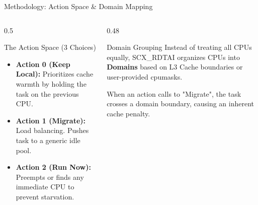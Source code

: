 \documentclass[aspectratio=169]{beamer}
\begin{document}
\begin{frame}{Methodology: Action Space \& Domain Mapping}
    \begin{columns}[T]
        \begin{column}{0.5\textwidth}
            \begin{exampleblock}{The Action Space (3 Choices)}
                \small
                \begin{itemize}
                    \item \textbf{Action 0 (Keep Local):} Prioritizes cache warmth by holding the task on the previous CPU.
                    \item \textbf{Action 1 (Migrate):} Load balancing. Pushes task to a generic idle pool.
                    \item \textbf{Action 2 (Run Now):} Preempts or finds any immediate CPU to prevent starvation.
                \end{itemize}
            \end{exampleblock}
        \end{column}
        
        \begin{column}{0.48\textwidth}
            \begin{alertblock}{Domain Grouping}
                \small
                Instead of treating all CPUs equally, SCX\_RDTAI organizes CPUs into \textbf{Domains} based on L3 Cache boundaries or user-provided cpumasks.
                
                \vspace{4pt}
                When an action calls to "Migrate", the task crosses a domain boundary, causing an inherent cache penalty.
            \end{alertblock}
        \end{column}
    \end{columns}
\end{frame}
\end{document}
